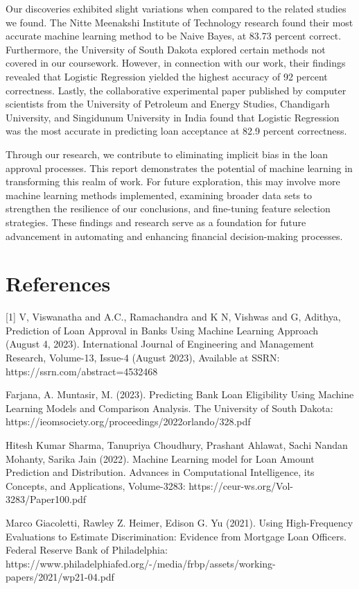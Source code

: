 \documentclass{article}
\begin{document}
Our discoveries exhibited slight variations when compared to the related studies we found. The Nitte Meenakshi Institute of Technology research found their most accurate machine learning method to be Naive Bayes, at 83.73 percent correct. Furthermore, the University of South Dakota explored certain methods not covered in our coursework. However, in connection with our work, their findings revealed that Logistic Regression yielded the highest accuracy of 92 percent correctness. Lastly, the collaborative experimental paper published by computer scientists from the University of Petroleum and Energy Studies, Chandigarh University, and Singidunum University in India found that Logistic Regression was the most accurate in predicting loan acceptance at 82.9 percent correctness. 

Through our research, we contribute to eliminating implicit bias in the loan approval processes. This report demonstrates the potential of machine learning in transforming this realm of work. For future exploration, this may involve more machine learning methods implemented, examining broader data sets to strengthen the resilience of our conclusions, and fine-tuning feature selection strategies. These findings and research serve as a foundation for future advancement in automating and enhancing financial decision-making processes.


    

\section{References}

[1] V, Viswanatha and A.C., Ramachandra and K N, Vishwas and G, Adithya, Prediction of Loan Approval in Banks Using Machine Learning Approach (August 4, 2023). International Journal of Engineering and Management Research, Volume-13, Issue-4 (August 2023), Available at SSRN: https://ssrn.com/abstract=4532468

\noindent[2] Farjana, A. Muntasir, M. (2023). Predicting Bank Loan Eligibility Using Machine Learning Models and Comparison Analysis. The University of South Dakota: https://ieomsociety.org/proceedings/2022orlando/328.pdf

\noindent [3] Hitesh Kumar Sharma, Tanupriya Choudhury, Prashant Ahlawat, Sachi Nandan Mohanty, Sarika Jain (2022). Machine Learning model for Loan Amount Prediction and
Distribution. Advances in Computational Intelligence, its Concepts, and Applications, Volume-3283: https://ceur-ws.org/Vol-3283/Paper100.pdf

\noindent [4] Marco Giacoletti, Rawley Z. Heimer, Edison G. Yu (2021). Using High-Frequency Evaluations to Estimate Discrimination: Evidence from Mortgage Loan Officers. Federal Reserve Bank of Philadelphia: https://www.philadelphiafed.org/-/media/frbp/assets/working-papers/2021/wp21-04.pdf
\end{document}
